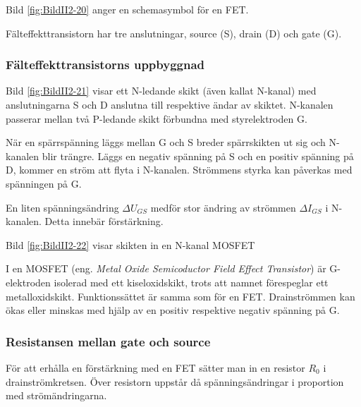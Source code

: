 
Bild \ref{fig:BildII2-20} anger en schemasymbol för en FET.

Fälteffekttransistorn har tre anslutningar, source (S), drain (D) och gate (G).


\subsubsection{Fälteffekttransistorns uppbyggnad}

Bild \ref{fig:BildII2-21} visar ett N-ledande skikt (även kallat N-kanal) med
anslutningarna S och D anslutna till respektive ändar av skiktet.
N-kanalen passerar mellan två P-ledande skikt förbundna med styrelektroden G.

När en spärrspänning läggs mellan G och S breder spärrskikten ut sig och N-kanalen blir trängre.
Läggs en negativ spänning på S och en positiv spänning på D, kommer en ström att flyta i N-kanalen.
Strömmens styrka kan påverkas med spänningen på G.

En liten spänningsändring \(\Delta U_{GS}\) medför stor ändring av strömmen
\(\Delta I_{GS}\) i N-kanalen. Detta innebär förstärkning.



Bild \ref{fig:BildII2-22} visar skikten in en N-kanal MOSFET

I en MOSFET (eng. \emph{Metal Oxide Semicoductor Field Effect Transistor}) är G-elektroden isolerad med ett kiseloxidskikt, trots att namnet förespeglar ett metalloxidskikt. Funktionssättet är samma som för en FET.
Drainströmmen kan ökas eller minskas med hjälp av en positiv respektive negativ spänning på G.

\subsubsection{Resistansen mellan gate och source}

För att erhålla en förstärkning med en FET sätter man in en resistor \(R_0\) i drainströmkretsen.
Över resistorn uppstår då spänningsändringar i proportion med strömändringarna.


